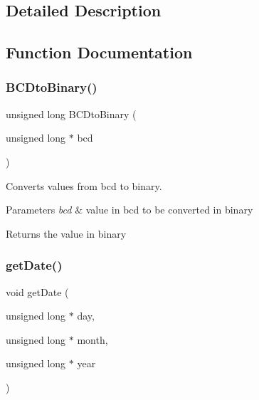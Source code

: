 \subsection{Detailed Description}


\subsection{Function Documentation}
\mbox{\label{group___r_t_c_gac415cba00d3b076015e540f85de75b45}} 
\subsubsection{\texorpdfstring{B\+C\+Dto\+Binary()}{BCDtoBinary()}}
{\footnotesize\ttfamily unsigned long B\+C\+Dto\+Binary (\begin{DoxyParamCaption}\item[{unsigned long $\ast$}]{bcd }\end{DoxyParamCaption})}



Converts values from bcd to binary. 


\begin{DoxyParams}{Parameters}
{\em bcd} & value in bcd to be converted in binary \\
\hline
\end{DoxyParams}
\begin{DoxyReturn}{Returns}
the value in binary 
\end{DoxyReturn}
\mbox{\label{group___r_t_c_ga151db8d516dd649f8d14dab18be79882}} 
\subsubsection{\texorpdfstring{get\+Date()}{getDate()}}
{\footnotesize\ttfamily void get\+Date (\begin{DoxyParamCaption}\item[{unsigned long $\ast$}]{day,  }\item[{unsigned long $\ast$}]{month,  }\item[{unsigned long $\ast$}]{year }\end{DoxyParamCaption})}



